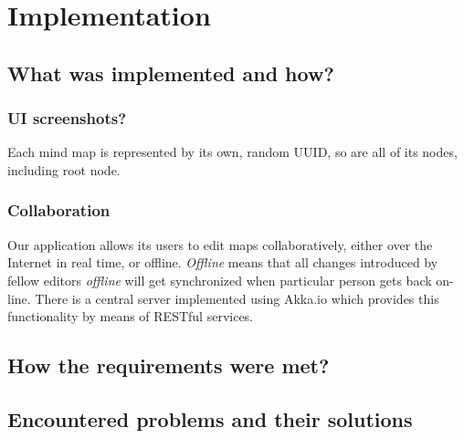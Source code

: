 %
%
%
%
%

\chapter{Implementation}
\label{chap:implementation}

\section{What was implemented and how?}
\label{sec:got-implemented}

\subsection{UI screenshots?}
\label{subsec:ui}

Each mind map is represented by its own, random UUID, so are all of its nodes, including root node.

\subsection{Collaboration}
\label{subsec:collaboration}

Our application allows its users to edit maps collaboratively, either over the Internet in real time, or offline. {\em Offline} means that all changes introduced by fellow editors {\em offline} will get synchronized when particular person gets back on-line. There is a central server implemented using Akka.io which provides this functionality by means of RESTful services.

\section{How the requirements were met?}
\label{sec:met-requirements}

\section{Encountered problems and their solutions}
\label{sec:impl-problems}
